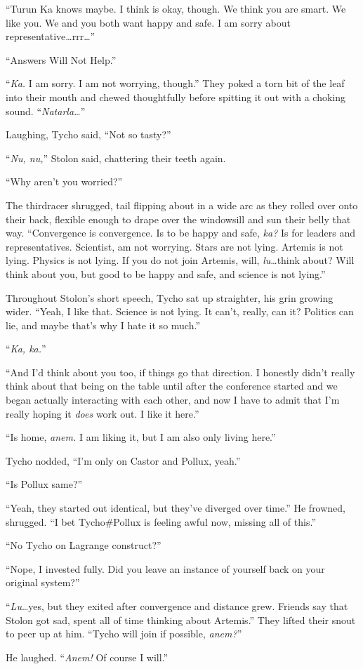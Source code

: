 ``Turun Ka knows maybe. I think is okay, though. We think you are smart. We like you. We and you both want happy and safe. I am sorry about representative\ldots rrr\ldots{}''

``Answers Will Not Help.''

``\emph{Ka.} I am sorry. I am not worrying, though.'' They poked a torn bit of the leaf into their mouth and chewed thoughtfully before spitting it out with a choking sound. ``\emph{Natarla\ldots{}}''

Laughing, Tycho said, ``Not so tasty?''

``\emph{Nu, nu,}'' Stolon said, chattering their teeth again.

``Why aren't you worried?''

The thirdracer shrugged, tail flipping about in a wide arc as they rolled over onto their back, flexible enough to drape over the windowsill and sun their belly that way. ``Convergence is convergence. Is to be happy and safe, \emph{ka?} Is for leaders and representatives. Scientist, am not worrying. Stars are not lying. Artemis is not lying. Physics is not lying. If you do not join Artemis, will, \emph{lu}\ldots think about? Will think about you, but good to be happy and safe, and science is not lying.''

Throughout Stolon's short speech, Tycho sat up straighter, his grin growing wider. ``Yeah, I like that. Science is not lying. It can't, really, can it? Politics can lie, and maybe that's why I hate it so much.''

``\emph{Ka, ka.}''

``And I'd think about you too, if things go that direction. I honestly didn't really think about that being on the table until after the conference started and we began actually interacting with each other, and now I have to admit that I'm really hoping it \emph{does} work out. I like it here.''

``Is home, \emph{anem.} I am liking it, but I am also only living here.''

Tycho nodded, ``I'm only on Castor and Pollux, yeah.''

``Is Pollux same?''

``Yeah, they started out identical, but they've diverged over time.'' He frowned, shrugged. ``I bet Tycho\#Pollux is feeling awful now, missing all of this.''

``No Tycho on Lagrange construct?''

``Nope, I invested fully. Did you leave an instance of yourself back on your original system?''

``\emph{Lu}\ldots yes, but they exited after convergence and distance grew. Friends say that Stolon got sad, spent all of time thinking about Artemis.'' They lifted their snout to peer up at him. ``Tycho will join if possible, \emph{anem?}''

He laughed. ``\emph{Anem!} Of course I will.''
